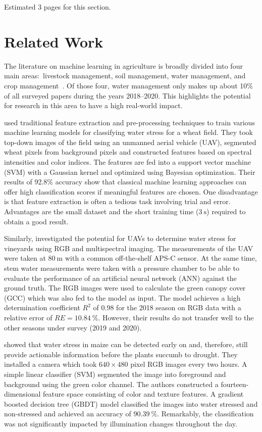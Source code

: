 \documentclass[draft,final]{vutinfth} %
\begin{document}
Estimated 3 pages for this section.

\section{Related Work}
\label{sec:related-work}

The literature on machine learning in agriculture is broadly divided
into four main areas:~livestock management, soil management, water
management, and crop management~\cite{benos2021}. Of those four, water
management only makes up about 10\% of all surveyed papers during the
years 2018--2020. This highlights the potential for research in this
area to have a high real-world impact.

\textcite{su2020} used traditional feature extraction and
pre-processing techniques to train various machine learning models for
classifying water stress for a wheat field. They took top-down images
of the field using an unmanned aerial vehicle (UAV), segmented wheat
pixels from background pixels and constructed features based on
spectral intensities and color indices. The features are fed into a
support vector machine (SVM) with a Gaussian kernel and optimized
using Bayesian optimization. Their results of 92.8\% accuracy show
that classical machine learning approaches can offer high
classification scores if meaningful features are chosen. One
disadvantage is that feature extraction is often a tedious task
involving trial and error. Advantages are the small dataset and the
short training time ($\qty{3}{\second}$) required to obtain a good
result.

Similarly, \textcite{lopez-garcia2022} investigated the potential for
UAVs to determine water stress for vineyards using RGB and
multispectral imaging. The measurements of the UAV were taken at
$\qty{80}{\meter}$ with a common off-the-shelf APS-C sensor. At the
same time, stem water measurements were taken with a pressure chamber
to be able to evaluate the performance of an artificial neural network
(ANN) against the ground truth. The RGB images were used to calculate
the green canopy cover (GCC) which was also fed to the model as
input. The model achieves a high determination coefficient $R^{2}$ of
$0.98$ for the 2018 season on RGB data with a relative error of
$RE = \qty{10.84}{\percent}$. However, their results do not transfer
well to the other seasons under survey (2019 and 2020).

\textcite{zhuang2017} showed that water stress in maize can be
detected early on and, therefore, still provide actionable information
before the plants succumb to drought. They installed a camera which
took $640\times480$ pixel RGB images every two hours. A simple linear
classifier (SVM) segmented the image into foreground and background
using the green color channel. The authors constructed a
fourteen-dimensional feature space consisting of color and texture
features. A gradient boosted decision tree (GBDT) model classified the
images into water stressed and non-stressed and achieved an accuracy
of $\qty{90.39}{\percent}$. Remarkably, the classification was not
significantly impacted by illumination changes throughout the day.
\end{document}

